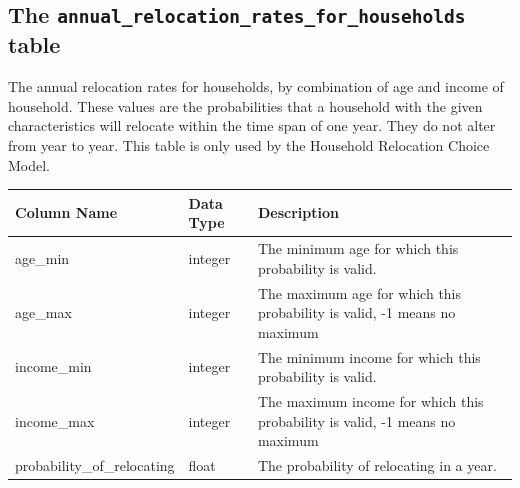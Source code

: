 \subsection{The {\tt annual_relocation_rates_for_households} table}


The annual relocation rates for households, by combination of age and income of
household. These values are the probabilities that a household with the given
characteristics will relocate within the time span of one year. They do not
alter from year to year. This table is only used by the Household Relocation
Choice Model. \modelsindex


\begin{tabular}{|l|l|p{4in}|}
\hline
\textbf{Column Name} & \textbf{Data Type} & \textbf{Description} \\
\hline
age_min & integer & The minimum age for which this probability is valid.  \\
\hline
age_max & integer & The maximum age for which this probability is valid, -1 means no maximum  \\
\hline
income_min & integer & The minimum income for which this probability is valid.  \\
\hline
income_max & integer & The maximum income for which this probability is valid, -1 means no maximum  \\
\hline
probability_of_relocating & float & The probability of relocating in a year.  \\
\hline

\end{tabular}

